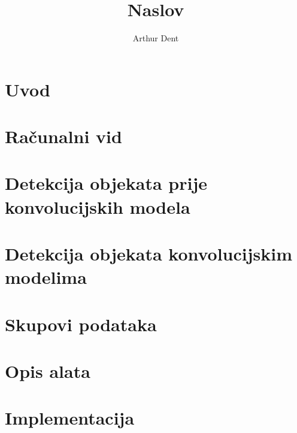 \documentclass[times, utf8, diplomski]{fer}
\begin{document}

\title{Naslov}

\author{Arthur Dent}

\maketitle

\izvornik

\zahvala{}

\tableofcontents

\chapter{Uvod}


\chapter{Računalni vid}



\chapter{Detekcija objekata prije konvolucijskih modela}



\chapter{Detekcija objekata konvolucijskim modelima}



\chapter{Skupovi podataka}

\chapter{Opis alata}

\chapter{Implementacija}
\end{document}
